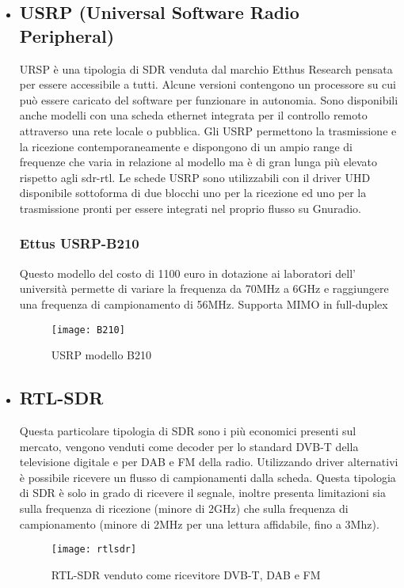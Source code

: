 \begin{itemize}
\begin{figure}[h]
\begin{minipage}[b]{.4\columnwidth}
	\end{minipage}\hfill
\end{figure}
\item \subsection{USRP (Universal Software Radio Peripheral)} URSP è una tipologia di SDR venduta dal marchio Etthus Research pensata per essere accessibile a tutti. Alcune versioni contengono un processore su cui può essere caricato del software per funzionare in autonomia. Sono disponibili anche modelli con una scheda ethernet integrata per il controllo remoto attraverso una rete locale o pubblica. Gli USRP permettono la trasmissione e la ricezione contemporaneamente e dispongono di un ampio range di frequenze che varia in relazione al modello ma è di gran lunga più elevato rispetto agli sdr-rtl. Le schede USRP sono utilizzabili con il driver UHD disponibile sottoforma di due blocchi uno per la ricezione ed uno per la trasmissione pronti per essere integrati nel proprio flusso su Gnuradio.
\subsubsection{Ettus USRP-B210}
Questo modello del costo di 1100 euro in dotazione ai laboratori dell' università permette di variare la frequenza da 70MHz a 6GHz e raggiungere una frequenza di campionamento di 56MHz. Supporta MIMO in full-duplex
\begin{figure}[h]
	\centering
	\texttt{[image: B210]}
	\caption{USRP modello B210\cite{b210}}\label{fig:1}
\end{figure}


\item \subsection{RTL-SDR} Questa particolare tipologia di SDR sono i più economici presenti sul mercato, vengono venduti come decoder per lo standard DVB-T della televisione digitale e per DAB e FM della radio. Utilizzando driver alternativi è possibile ricevere un flusso di campionamenti dalla scheda. Questa tipologia di SDR è solo in grado di ricevere il segnale, inoltre presenta limitazioni sia sulla frequenza di ricezione (minore di 2GHz) che sulla frequenza di campionamento (minore di 2MHz per una lettura affidabile, fino a 3Mhz).
\begin{figure}[h]
	\centering
	\texttt{[image: rtlsdr]}
	\caption{RTL-SDR venduto come ricevitore DVB-T, DAB e FM\cite{rtlsdr}}\label{fig:1}
\end{figure}


\end{itemize}

